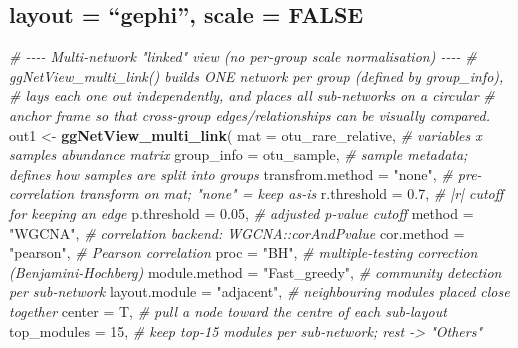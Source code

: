 \documentclass[
]{book}
\newenvironment{Shaded}{\begin{snugshade}}{\end{snugshade}}
\newcommand{\AttributeTok}[1]{\textcolor[rgb]{0.13,0.29,0.53}{#1}}
\newcommand{\CommentTok}[1]{\textcolor[rgb]{0.56,0.35,0.01}{\textit{#1}}}
\newcommand{\DecValTok}[1]{\textcolor[rgb]{0.00,0.00,0.81}{#1}}
\newcommand{\FloatTok}[1]{\textcolor[rgb]{0.00,0.00,0.81}{#1}}
\newcommand{\FunctionTok}[1]{\textcolor[rgb]{0.13,0.29,0.53}{\textbf{#1}}}
\newcommand{\NormalTok}[1]{#1}
\newcommand{\OtherTok}[1]{\textcolor[rgb]{0.56,0.35,0.01}{#1}}
\newcommand{\StringTok}[1]{\textcolor[rgb]{0.31,0.60,0.02}{#1}}
\begin{document}
\subsection{layout = ``gephi'', scale = FALSE}\label{layout-gephi-scale-false}

\begin{Shaded}
\begin{Highlighting}[]
\CommentTok{\# {-}{-}{-}{-} Multi{-}network "linked" view (no per{-}group scale normalisation) {-}{-}{-}{-}}
\CommentTok{\# \textasciigrave{}ggNetView\_multi\_link()\textasciigrave{} builds ONE network per group (defined by \textasciigrave{}group\_info\textasciigrave{}),}
\CommentTok{\# lays each one out independently, and places all sub{-}networks on a circular}
\CommentTok{\# anchor frame so that cross{-}group edges/relationships can be visually compared.}
\NormalTok{out1 }\OtherTok{\textless{}{-}} \FunctionTok{ggNetView\_multi\_link}\NormalTok{(}
  \AttributeTok{mat              =}\NormalTok{ otu\_rare\_relative, }\CommentTok{\# variables x samples abundance matrix}
  \AttributeTok{group\_info       =}\NormalTok{ otu\_sample,        }\CommentTok{\# sample metadata; defines how samples are split into groups}
  \AttributeTok{transfrom.method =} \StringTok{"none"}\NormalTok{,            }\CommentTok{\# pre{-}correlation transform on \textasciigrave{}mat\textasciigrave{}; "none" = keep as{-}is}
  \AttributeTok{r.threshold      =} \FloatTok{0.7}\NormalTok{,               }\CommentTok{\# |r| cutoff for keeping an edge}
  \AttributeTok{p.threshold      =} \FloatTok{0.05}\NormalTok{,              }\CommentTok{\# adjusted p{-}value cutoff}
  \AttributeTok{method           =} \StringTok{"WGCNA"}\NormalTok{,           }\CommentTok{\# correlation backend: WGCNA::corAndPvalue}
  \AttributeTok{cor.method       =} \StringTok{"pearson"}\NormalTok{,         }\CommentTok{\# Pearson correlation}
  \AttributeTok{proc             =} \StringTok{"BH"}\NormalTok{,              }\CommentTok{\# multiple{-}testing correction (Benjamini{-}Hochberg)}
  \AttributeTok{module.method    =} \StringTok{"Fast\_greedy"}\NormalTok{,     }\CommentTok{\# community detection per sub{-}network}
  \AttributeTok{layout.module    =} \StringTok{"adjacent"}\NormalTok{,        }\CommentTok{\# neighbouring modules placed close together}
  \AttributeTok{center           =}\NormalTok{ T,                 }\CommentTok{\# pull a node toward the centre of each sub{-}layout}
  \AttributeTok{top\_modules      =} \DecValTok{15}\NormalTok{,                }\CommentTok{\# keep top{-}15 modules per sub{-}network; rest {-}\textgreater{} "Others"}

\end{Highlighting}
\end{Shaded}
\end{document}
